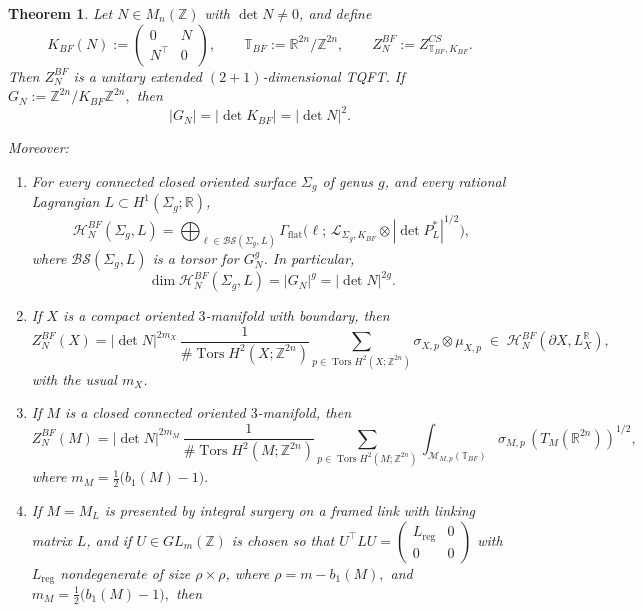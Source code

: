 \documentclass[12pt]{amsart}
\numberwithin{equation}{section}
\newtheorem{theorem}{Theorem}[section]
\theoremstyle{definition}
\begin{document}
\begin{theorem}
\label{thm:bf-tqft-data}
Let $N\in M_n(\mathbb Z)$ with $\det N\neq 0$, and define
$$
K_{BF}(N):=
\begin{pmatrix}
0 & N\\
N^\top & 0
\end{pmatrix},
\qquad
\mathbb T_{BF}:=\mathbb R^{2n}/\mathbb Z^{2n},
\qquad
Z_N^{BF}:=Z^{CS}_{\mathbb T_{BF},K_{BF}}.
$$
Then $Z_N^{BF}$ is a unitary extended $(2+1)$-dimensional TQFT. If $G_N:=\mathbb Z^{2n}/K_{BF}\mathbb Z^{2n},$ then
$$
|G_N|=|\det K_{BF}|=|\det N|^2.
$$

Moreover:

\begin{enumerate}[label=\roman*)]
\item For every connected closed oriented surface $\Sigma_g$ of genus $g$, and every
rational Lagrangian $L\subset H^1(\Sigma_g;\mathbb R)$,
$$
\mathcal H_N^{BF}(\Sigma_g,L)
=
\bigoplus_{\ell\in \mathcal{BS}(\Sigma_g,L)}
\Gamma_{\mathrm{flat}}\!\bigl(\ell;\,\mathcal L_{\Sigma_g,K_{BF}}
\otimes |\det P_L^*|^{1/2}\bigr),
$$
where $\mathcal{BS}(\Sigma_g,L)$ is a torsor for $G_N^g$. In particular,
$$
\dim \mathcal H_N^{BF}(\Sigma_g,L)=|G_N|^g=|\det N|^{2g}.
$$

\item If $X$ is a compact oriented $3$-manifold with boundary, then
$$
Z_N^{BF}(X)
=
|\det N|^{2m_X}\,
\frac{1}{\#\operatorname{Tors}H^2(X;\mathbb Z^{2n})}
\sum_{p\in \operatorname{Tors}H^2(X;\mathbb Z^{2n})}
\sigma_{X,p}\otimes \mu_{X,p}
\;\in\;
\mathcal H_N^{BF}(\partial X,L_X^{\mathbb R}),
$$
with the usual $m_X$.

\item If $M$ is a closed connected oriented $3$-manifold, then
$$
Z_N^{BF}(M)
=
|\det N|^{2m_M}\,
\frac{1}{\#\operatorname{Tors}H^2(M;\mathbb Z^{2n})}
\sum_{p\in \operatorname{Tors}H^2(M;\mathbb Z^{2n})}
\int_{\mathcal M_{M,p}(\mathbb T_{BF})}
\sigma_{M,p}\,(T_M(\mathbb R^{2n}))^{1/2},
$$
where $m_M=\frac12\bigl(b_1(M)-1\bigr).$

\item If $M=M_L$ is presented by integral surgery on a framed link with linking matrix
$L$, and if $U\in GL_m(\mathbb Z)$ is chosen so that $U^\top L U=\left(\begin{smallmatrix} L_{\mathrm{reg}}&0\\ 0&0 \end{smallmatrix}\right)$ with $L_{\mathrm{reg}}$ nondegenerate of size $\rho\times \rho$, where $\rho=m-b_1(M), $ and $m_M=\frac12\bigl(b_1(M)-1\bigr),$ then


\end{enumerate}
\end{theorem}
\end{document}

